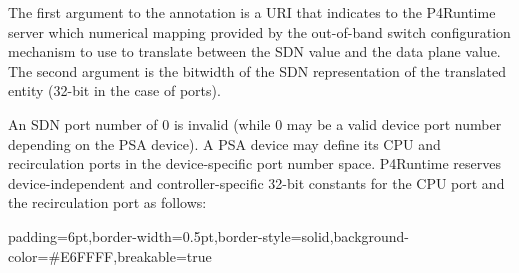 \documentclass[11pt]{article}
\begin{document}
{%
\noindent{}The first argument to the  annotation is a URI that
indicates to the P4Runtime server which numerical mapping \textemdash{} provided by the
out-of-band switch configuration mechanism \textemdash{} to use to translate between the
SDN value and the data plane value. The second argument is the bitwidth of the
SDN representation of the translated entity (32-bit in the case of ports).%

An SDN port number of 0 is invalid (while 0 may be a valid device port number
depending on the PSA device). A PSA device may define its CPU and recirculation
ports in the device-specific port number space. P4Runtime reserves
device-independent and controller-specific 32-bit constants for the CPU port and
the recirculation port as follows:%

\begin{mdbmargintb}{6pt}{6pt}%
\begin{mdblock}{padding=6pt,border-width=0.5pt,border-style=solid,background-color=\#E6FFFF,breakable=true}%
\begin{mdpre}%
\end{mdpre}%
\end{mdblock}%
\end{mdbmargintb}%

}
\end{document}
